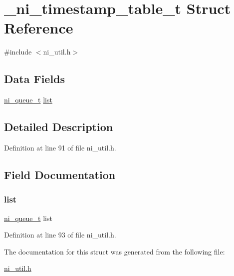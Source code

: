 \hypertarget{struct__ni__timestamp__table__t}{}\section{\+\_\+ni\+\_\+timestamp\+\_\+table\+\_\+t Struct Reference}
\label{struct__ni__timestamp__table__t}


{\ttfamily \#include $<$ni\+\_\+util.\+h$>$}

\subsection*{Data Fields}
\begin{DoxyCompactItemize}
\item 
\mbox{\hyperlink{ni__util_8h_a0e1cb2c303be6205ec60736b6a519d84}{ni\+\_\+queue\+\_\+t}} \mbox{\hyperlink{struct__ni__timestamp__table__t_a89feae37b4b3a60b175d832f03d5b971}{list}}
\end{DoxyCompactItemize}


\subsection{Detailed Description}


Definition at line 91 of file ni\+\_\+util.\+h.



\subsection{Field Documentation}
\mbox{\label{struct__ni__timestamp__table__t_a89feae37b4b3a60b175d832f03d5b971}} 
\subsubsection{\texorpdfstring{list}{list}}
{\footnotesize\ttfamily \mbox{\hyperlink{ni__util_8h_a0e1cb2c303be6205ec60736b6a519d84}{ni\+\_\+queue\+\_\+t}} list}



Definition at line 93 of file ni\+\_\+util.\+h.



The documentation for this struct was generated from the following file\+:\begin{DoxyCompactItemize}
\item 
\mbox{\hyperlink{ni__util_8h}{ni\+\_\+util.\+h}}\end{DoxyCompactItemize}
